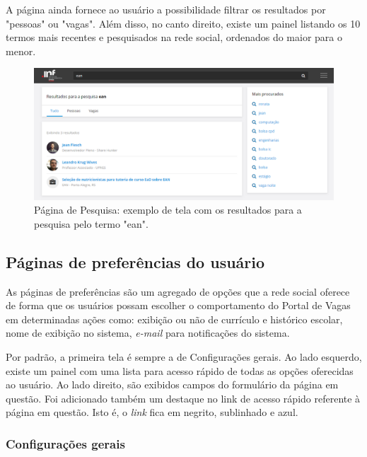 A página ainda fornece ao usuário a possibilidade filtrar os resultados por "pessoas" ou "vagas". Além disso, no canto direito, existe um painel listando os 10 termos mais recentes e pesquisados na rede social, ordenados do maior para o menor.

\begin{figure}[ht]
    \caption{Página de Pesquisa: exemplo de tela com os resultados para a pesquisa pelo termo "ean".
    }
       	\begin{center}
            \includegraphics[width=1\textwidth]{figuras/pesquisa.png}
        \end{center}
    \label{PDVPesquisaTela}
\end{figure}

\subsection{Páginas de preferências do usuário}
\label{PDVFunConfiguracoes}

As páginas de preferências são um agregado de opções que a rede social oferece de forma que os usuários possam escolher o comportamento do Portal de Vagas em determinadas ações como: exibição ou não de currículo e histórico escolar, nome de exibição no sistema, \textit{e-mail} para notificações do sistema.

Por padrão, a primeira tela é sempre a de Configurações gerais. Ao lado esquerdo, existe um painel com uma lista para acesso rápido de todas as opções oferecidas ao usuário. Ao lado direito, são exibidos campos do formulário da página em questão. Foi adicionado também um destaque no link de acesso rápido referente à página em questão. Isto é, o \textit{link} fica em negrito, sublinhado e azul.

\subsubsection{Configurações gerais}
\label{PDVFunConfiguracoesGeral}

